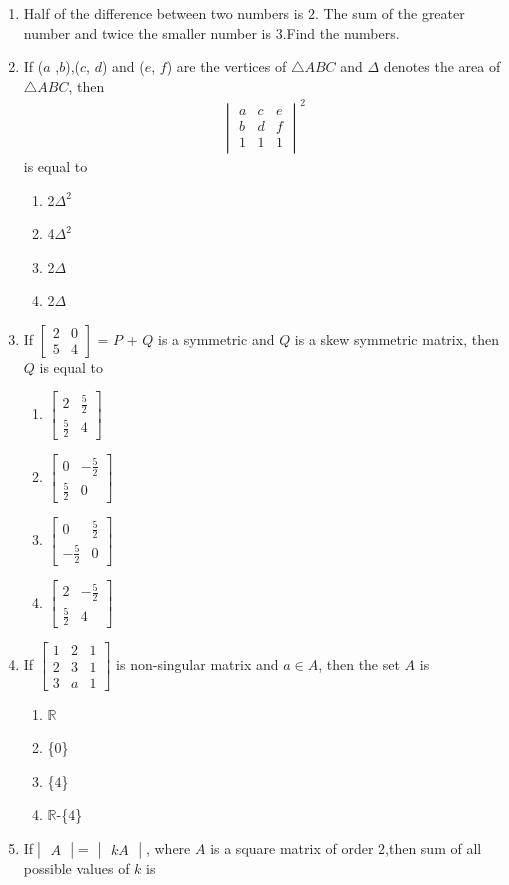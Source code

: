 \documentclass[12pt,-letter paper]{article}
\providecommand{\mydet}[1]{\ensuremath{\begin{vmatrix}#1\end{vmatrix}}}
\providecommand{\myvec}[1]{\ensuremath{\begin{bmatrix}#1\end{bmatrix}}}
\begin{document}
\begin{enumerate}
\begin{enumerate}[label=(\alph*)]
\end{enumerate}
\item Half of the difference between two numbers is $2$. The sum of the greater number and twice the smaller number is $3$.Find the numbers.
\item If ($a$ ,$b$),($c$, $d$) and ($e$, $f$) are the vertices of $\triangle$$ABC$ and $\Delta$ denotes the area of $\triangle$$ABC$, then 
  \begin{align}
      \mydet{a & c & e\\b & d& f\\1&1&1}^2 
  \end{align}  
 is equal to
\begin{enumerate}[label=(\alph*)]
    \item 2$\Delta ^2$
    \item 4$\Delta ^2$ 
    \item 2$\Delta$
    \item 2$\Delta$
\end{enumerate}
    \item If $\myvec{2 & 0 \\5 & 4}$ = $P$ + $Q$ 
is a symmetric and $Q$ is a skew symmetric matrix, then $Q$ is equal to
\begin{enumerate}[label=(\alph*)]
    \item $\myvec{2  & \frac{5}{2} \\\frac{5}{2} & 4 }$
    \item $\myvec{ 0 & -\frac{5}{2} \\\frac{5}{2} & 0}$
    \item $\myvec{ 0 & \frac{5}{2} \\-\frac{5}{2} & 0}$
    \item $\myvec{2 & -\frac{5}{2} \\\frac{5}{2} & 4 }$
\end{enumerate}
\item If $\myvec{1 & 2 & 1 \\2 & 3 & 1 \\3 & a & 1}$
is non-singular matrix and  $a \in A $, then the set $A$ is 
\begin{enumerate}[label=(\alph*)]
    \item $\mathbb{R}$
    \item \{$0$\}
    \item \{$4$\}
    \item $\mathbb{R}$-\{$4$\}
\end{enumerate}
\item If$\mydet{A} $= $\mydet{ kA}$, where $A$ is a square matrix of order $2$,then sum of all possible values of $k$ is

\end{enumerate}
\end{document}
